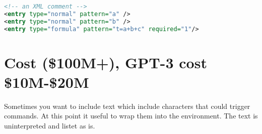 \small
\begin{lstlisting}[keywordstyle=\color{blue},language=XML]
<!-- an XML comment -->
<entry type="normal" pattern="a" />
<entry type="normal" pattern="b" />
<entry type="formula" pattern="t=a+b+c" required="1"/>
\end{lstlisting}
\normalsize	

\section{Cost (\$100M+), GPT-3 cost \$10M-\$20M}

Sometimes you want to include text which include characters that could trigger commands. At this point it useful to wrap them into the  environment. The text is uninterpreted and listet as is.
